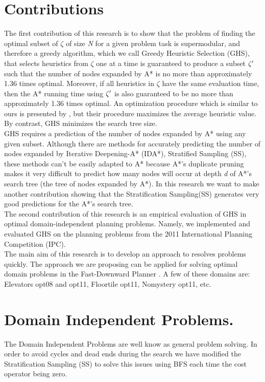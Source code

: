 \documentclass[11pt,a4paper,oneside]{report}
\begin{document}
\section{Contributions}
The first contribution of this research is to show that the problem of finding the optimal subset of $\zeta$ of size \textit{N} for a given problem task is supermodular, and therefore a greedy algorithm, which we call Greedy Heuristic Selection (GHS), that selects heuristics from $\zeta$ one at a time is guaranteed to produce a subset $\zeta\sp{\prime}$ such that the number of nodes expanded by A* is no more than approximately 1.36 times optimal. Moreover, if all heuristics in $\zeta$ have the same evaluation time, then the A* running time using $\zeta\sp{\prime}$ is also guaranteed to be no more than approximately 1.36 times optimal. An optimization procedure which is similar to ours is presented by \citep{raynersss13}, but their procedure maximizes the average heuristic value. By contrast, GHS minimizes the search tree size.\\

GHS requires a prediction of the number of nodes expanded by A* using any given subset. Although there are methods for accurately predicting the number of nodes expanded by Iterative Deepening-A* \citep{korf2001timecomplexity} (IDA*), Stratified Sampling \citep{lelis2013predicting} (SS), these methods can't be easily adapted to A* because A*'s duplicate pruning makes it very difficult to predict how many nodes will occur at depth \textit{d} of A*'s search tree (the tree of nodes expanded by A*). In this research we want to make another contribution showing that the Stratification Sampling(SS) generates very good predictions for the A*'s search tree.\\

The second contribution of this research is an empirical evaluation of GHS in optimal domain-independent planning problems. Namely, we implemented and evaluated GHS on the planning problems from the 2011 International Planning Competition (IPC).\\

The main aim of this research is to develop an approach to resolves problems quickly. The approach we are proposing can be applied for solving optimal domain problems in the Fast-Downward Planner \citep{helmert2006fast}. A few of these domains are: Elevators opt08 and opt11, Floortile opt11, Nomystery opt11, etc.
\\

\section{Domain Independent Problems.}
The Domain Independent Problems are well know as general problem solving. In order to avoid cycles and dead ends during the search we have modified the Stratification Sampling (SS) to solve this issues using BFS each time the cost operator being zero.\\
\end{document}
